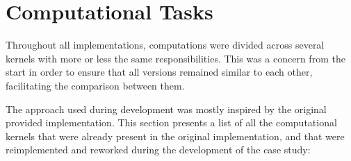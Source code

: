 \documentclass[main.tex]{subfiles}
\begin{document}
\section{Computational Tasks} \label{section:kernels}

Throughout all implementations, computations were divided across several kernels with more or less the same responsibilities. This was a concern from the start in order to ensure that all versions remained similar to each other, facilitating the comparison between them.

The approach used during development was mostly inspired by the original provided implementation. This section presents a list of all the computational kernels that were already present in the original implementation, and that were reimplemented and reworked during the development of the case study:
\end{document}
